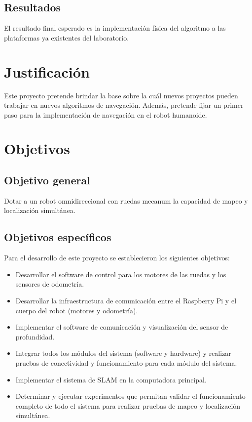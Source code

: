 \subsection{Resultados}
El resultado final esperado es la implementación física del algoritmo a las plataformas ya existentes del laboratorio.

\section{Justificación}
Este proyecto pretende brindar la base sobre la cuál nuevos proyectos pueden trabajar en nuevos algoritmos de navegación. Además, pretende fijar un primer paso para la implementación de navegación en el robot humanoide.

\section{Objetivos}

\subsection{Objetivo general}
Dotar a un robot omnidireccional con ruedas mecanum la capacidad de mapeo y localización simultánea.

\subsection{Objetivos específicos}
Para el desarrollo de este proyecto se establecieron los siguientes objetivos:

\begin{itemize} %
    \item Desarrollar el software de control para los motores de las ruedas y los sensores de odometría.
    \item Desarrollar la infraestructura de comunicación entre el Raspberry Pi y el cuerpo del robot (motores y odometría). \item Implementar el software de comunicación y visualización del sensor de profundidad.
    \item Integrar todos los módulos del sistema (software y hardware) y realizar pruebas de conectividad y funcionamiento para cada módulo del sistema.
    \item Implementar el sistema de SLAM en la computadora principal.
    \item Determinar y ejecutar experimentos que permitan validar el funcionamiento completo de todo el sistema para realizar pruebas de mapeo y localización simultánea.
\end{itemize}

